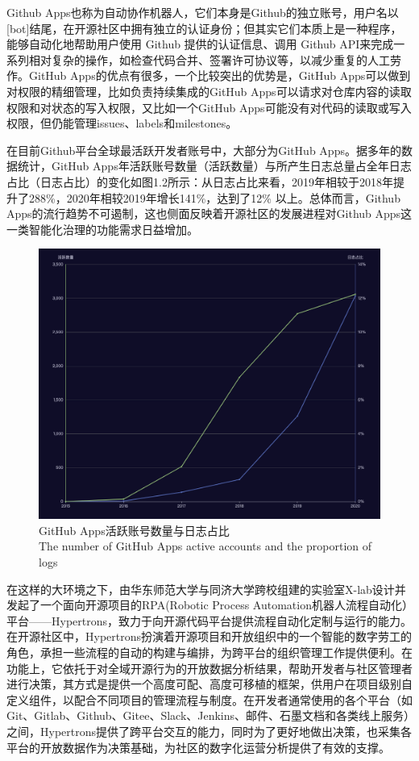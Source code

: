 \par Github Apps也称为自动协作机器人，它们本身是Github的独立账号，用户名以[bot]结尾，在开源社区中拥有独立的认证身份；但其实它们本质上是一种程序，能够自动化地帮助用户使用 Github 提供的认证信息、调用 Github API来完成一系列相对复杂的操作，如检查代码合并、签署许可协议等，以减少重复的人工劳作。GitHub Apps的优点有很多，一个比较突出的优势是，GitHub Apps可以做到对权限的精细管理，比如负责持续集成的GitHub Apps可以请求对仓库内容的读取权限和对状态的写入权限，又比如一个GitHub Apps可能没有对代码的读取或写入权限，但仍能管理issues、labels和milestones。

\par 在目前Github平台全球最活跃开发者账号中，大部分为GitHub Apps。据多年的数据统计，GitHub Apps年活跃账号数量（活跃数量）与所产生日志总量占全年日志占比（日志占比）的变化如图1.2所示：从日志占比来看，2019年相较于2018年提升了288\%，2020年相较2019年增长141\%，达到了12\% 以上。总体而言，Github Apps的流行趋势不可遏制，这也侧面反映着开源社区的发展进程对Github Apps这一类智能化治理的功能需求日益增加。
\begin{figure}[H]
    \centering
    \includegraphics[width=130mm]{./figures/image1-2.png}
    \caption{GitHub Apps活跃账号数量与日志占比\\The number of GitHub Apps active accounts and the proportion of logs}
\end{figure}

\par 在这样的大环境之下，由华东师范大学与同济大学跨校组建的实验室X-lab设计并发起了一个面向开源项目的RPA(Robotic Process Automation机器人流程自动化）平台——Hypertrons，致力于向开源代码平台提供流程自动化定制与运行的能力。在开源社区中，Hypertrons扮演着开源项目和开放组织中的一个智能的数字劳工的角色，承担一些流程的自动的构建与编排，为跨平台的组织管理工作提供便利。在功能上，它依托于对全域开源行为的开放数据分析结果，帮助开发者与社区管理者进行决策，其方式是提供一个高度可配、高度可移植的框架，供用户在项目级别自定义组件，以配合不同项目的管理流程与制度。在开发者通常使用的各个平台（如Git、Gitlab、Github、Gitee、Slack、Jenkins、邮件、石墨文档和各类线上服务）之间，Hypertrons提供了跨平台交互的能力，同时为了更好地做出决策，也采集各平台的开放数据作为决策基础，为社区的数字化运营分析提供了有效的支撑。

